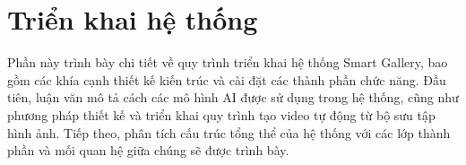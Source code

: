 \section{Triển khai hệ thống}

Phần này trình bày chi tiết về quy trình triển khai hệ thống Smart Gallery, bao gồm các khía cạnh thiết kế kiến trúc và cài đặt các thành phần chức năng. Đầu tiên, luận văn mô tả cách các mô hình AI được sử dụng trong hệ thống, cũng như phương pháp thiết kế và triển khai quy trình tạo video tự động từ bộ sưu tập hình ảnh. Tiếp theo, phân tích cấu trúc tổng thể của hệ thống với các lớp thành phần và mối quan hệ giữa chúng sẽ được trình bày.





